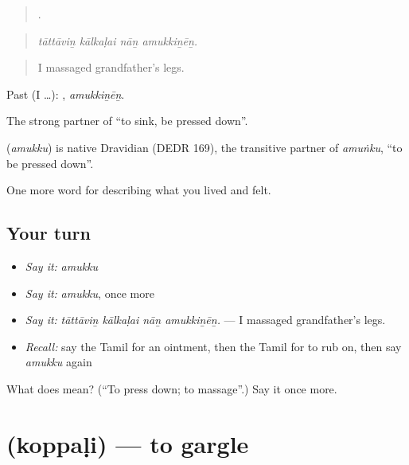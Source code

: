 \begin{quote}
   .
\end{quote}

\begin{quote}
\emph{tāttāviṉ kālkaḷai nāṉ amukkiṉēṉ.}
\end{quote}

\begin{quote}
I massaged grandfather’s legs.
\end{quote}

Past (I …): , \emph{amukkiṉēṉ}.

The strong partner of  \textquotedblleft{}to sink, be pressed down\textquotedblright{}.

\begin{cousinweb}
\textbf{} (\emph{amukku}) is native Dravidian (DEDR 169), the transitive partner of  \emph{amuṅku}, \textquotedblleft{}to be pressed down\textquotedblright{}.
\end{cousinweb}

\begin{grammarlens}[title={What you've built}]
One more word for describing what you lived and felt.
\end{grammarlens}

\subsection*{Your turn}
\begin{itemize}
\raggedright
  \item \emph{Say it:} \emph{amukku}
  \item \emph{Say it:} \emph{amukku}, once more
  \item \emph{Say it:} \emph{tāttāviṉ kālkaḷai nāṉ amukkiṉēṉ.} — I massaged grandfather’s legs.
  \item \emph{Recall:} say the Tamil for an ointment, then the Tamil for to rub on, then say \emph{amukku} again
\end{itemize}

\begin{tcolorbox}[breakable,colback=teal!4,colframe=teal!35!black,title={Before you move on}]
What does  mean? (\textquotedblleft{}To press down; to massage\textquotedblright{}.) Say it once more.
\end{tcolorbox}
\section[\texorpdfstring{\ta{கொப்பளி} (koppaḷi)}{கொப்பளி (koppaḷi)}]{ (koppaḷi) — to gargle}

